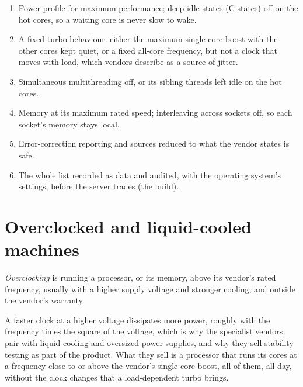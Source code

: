 \begin{method}\label{met:nw:servers:bios}
\begin{enumerate}
\item Power profile for maximum performance; deep idle states (C-states) off on the hot cores, so a waiting core is never slow to wake.
\item A fixed turbo behaviour: either the maximum single-core boost with the other cores kept quiet, or a fixed all-core frequency, but
  not a clock that moves with load, which vendors describe as a source of jitter.
\item Simultaneous multithreading off, or its sibling threads left idle on the hot cores.
\item Memory at its maximum rated speed; interleaving across sockets off, so each socket's memory stays local.
\item Error-correction reporting and  sources reduced to what the vendor states is safe.
\item The whole list recorded as data and audited, with the operating system's settings, before the server trades (the build).
\end{enumerate}
\end{method}

\section{Overclocked and liquid-cooled machines}

\begin{definition}[Overclocking]\label{def:nw:servers:oc}
\emph{Overclocking} is running a processor, or its memory, above its vendor's rated frequency, usually with a higher
supply voltage and stronger cooling, and outside the vendor's warranty.
\end{definition}

A faster clock at a higher voltage dissipates more power, roughly with the frequency times the square of the voltage, which is why the
specialist vendors pair  with liquid cooling and oversized power supplies, and why they sell stability testing as part of the
product. What they sell is a processor that runs its cores at a frequency close to or above the vendor's single-core boost, all of
them, all day, without the clock changes that a load-dependent turbo brings.


